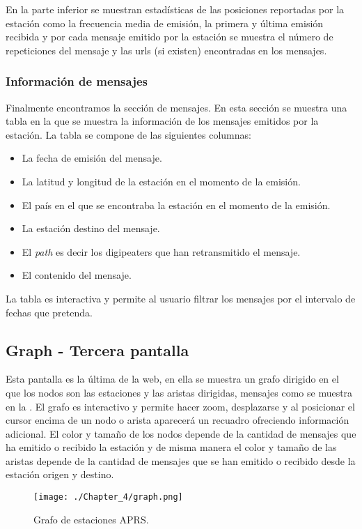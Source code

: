 En la parte inferior se muestran estadísticas de las posiciones reportadas por la estación como la frecuencia media de emisión, la primera y última emisión recibida y por cada mensaje emitido por la estación se muestra el número de repeticiones del mensaje y las urls (si existen) encontradas en los mensajes.

\subsubsection{Información de mensajes}
Finalmente encontramos la sección de mensajes. En esta sección se muestra una tabla en la que se muestra la información de los mensajes emitidos por la estación. La tabla se compone de las siguientes columnas:
\begin{itemize}
	\item La fecha de emisión del mensaje.
	\item La latitud y longitud de la estación en el momento de la emisión.
	\item El país en el que se encontraba la estación en el momento de la emisión.
	\item La estación destino del mensaje.
	\item El \textit{path} es decir los digipeaters que han retransmitido el mensaje.
	\item El contenido del mensaje.
\end{itemize} 

La tabla es interactiva y permite al usuario filtrar los mensajes por el intervalo de fechas que pretenda.

\subsection{Graph - Tercera pantalla}
Esta pantalla es la última de la web, en ella se muestra un grafo dirigido en el que los nodos son las estaciones y las aristas dirigidas, mensajes como se muestra en la . El grafo es interactivo y permite hacer zoom, desplazarse y al posicionar el cursor encima de un nodo o arista aparecerá un recuadro ofreciendo información adicional. El color y tamaño de los nodos depende de la cantidad de mensajes que ha emitido o recibido la estación y de misma manera el color y tamaño de las aristas depende de la cantidad de mensajes que se han emitido o recibido desde la estación origen y destino.

\begin{figure}[h]
	\centering
	\texttt{[image: ./Chapter\_4/graph.png]}
	\caption{Grafo de estaciones APRS.}
	\label{fig:graph}
\end{figure}

